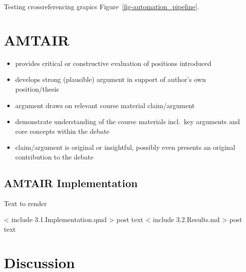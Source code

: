 \documentclass[
  11pt,
  letterpaper,
]{book}
\begin{document}
Testing crossreferencing grapics Figure~\ref{fig-automation_pipeline}.


\chapter{AMTAIR}\label{amtair}

\begin{tcolorbox}[enhanced jigsaw, colbacktitle=quarto-callout-note-color!10!white, toprule=.15mm, coltitle=black, opacityback=0, colback=white, bottomtitle=1mm, title=\textcolor{quarto-callout-note-color}{\faInfo}\hspace{0.5em}{20\% of Grade: \textasciitilde{} 29\% of text \textasciitilde{} 8700
words \textasciitilde{} 20 pages}, rightrule=.15mm, bottomrule=.15mm, breakable, arc=.35mm, toptitle=1mm, leftrule=.75mm, titlerule=0mm, left=2mm, opacitybacktitle=0.6, colframe=quarto-callout-note-color-frame]

\begin{itemize}
\item
  provides critical or constructive evaluation of positions introduced
\item
  develops strong (plausible) argument in support of author's own
  position/thesis
\item
  argument draws on relevant course material claim/argument
\item
  demonstrate understanding of the course materials incl.~key arguments
  and core concepts within the debate
\item
  claim/argument is original or insightful, possibly even presents an
  original contribution to the debate
\end{itemize}

\end{tcolorbox}

\section{AMTAIR Implementation}\label{sec-amtair-implementation}

Text to render

{{< include 3.1.Implementation.qmd >}} post text
{{< include 3.2.Results.md >}} post text


\chapter{Discussion}\label{discussion}
\end{document}
